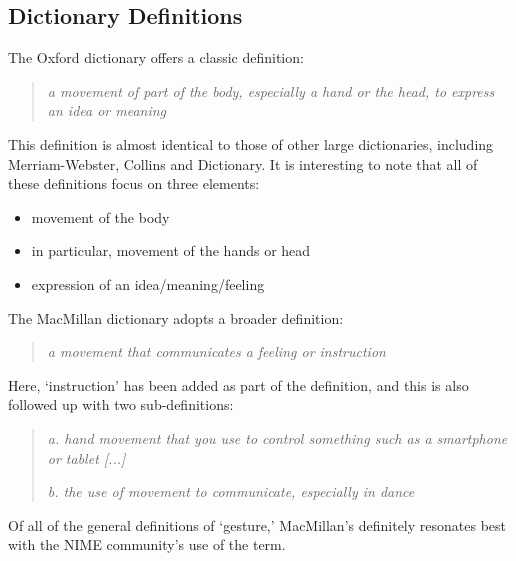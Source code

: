 \subsection{Dictionary Definitions}

The Oxford dictionary %
offers a classic definition: 

\begin{quotation}
\emph{a movement of part of the body, especially a hand or the head, to express an idea or meaning}
\end{quotation}

\noindent
This definition is almost identical to those of other large dictionaries, including Merriam-Webster, %
Collins %
and Dictionary. %
It is interesting to note that all of these definitions focus on three elements: 

\begin{itemize}
	\item movement of the body
	\item in particular, movement of the hands or head
	\item expression of an idea/meaning/feeling
\end{itemize}

\noindent
The MacMillan dictionary %
adopts a %
broader definition:

\begin{quotation}
\emph{a movement that communicates a feeling or instruction}
\end{quotation}

\noindent
Here, `instruction' has been added as part of the definition, and this is also followed up with two sub-definitions: 

\begin{quotation}

\emph{a. hand movement that you use to control something such as a smartphone or tablet [...]}

\emph{b. the use of movement to communicate, especially in dance}

\end{quotation}

\noindent
Of all of the general definitions of `gesture,' MacMillan's definitely resonates best with the NIME community's use of the term.


